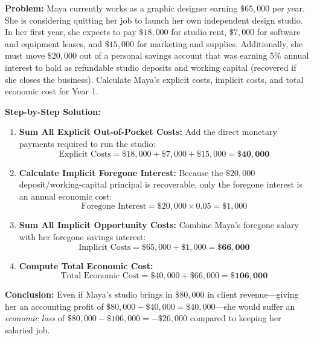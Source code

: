 \documentclass[11pt,letterpaper]{article}
\begin{document}
\begin{tcolorbox}[colback=CourseBlue!5!white,colframe=CourseBlue!80!black,title=\textbf{Work It Out: Calculating Economic vs. Accounting Cost}]
\textbf{Problem:} Maya currently works as a graphic designer earning $\$65{,}000$ per year. She is considering quitting her job to launch her own independent design studio. In her first year, she expects to pay $\$18{,}000$ for studio rent, $\$7{,}000$ for software and equipment leases, and $\$15{,}000$ for marketing and supplies. Additionally, she must move $\$20{,}000$ out of a personal savings account that was earning $5\%$ annual interest to hold as refundable studio deposits and working capital (recovered if she closes the business). Calculate Maya's explicit costs, implicit costs, and total economic cost for Year 1.

\medskip
\noindent\textbf{Step-by-Step Solution:}
\begin{enumerate}
    \item \textbf{Sum All Explicit Out-of-Pocket Costs:}
    Add the direct monetary payments required to run the studio:
    \[
    \text{Explicit Costs} = \$18{,}000 + \$7{,}000 + \$15{,}000 = \mathbf{\$40{,}000}
    \]

    \item \textbf{Calculate Implicit Foregone Interest:}
    Because the $\$20{,}000$ deposit/working-capital principal is recoverable, only the foregone interest is an annual economic cost:
    \[
    \text{Foregone Interest} = \$20{,}000 \times 0.05 = \$1{,}000
    \]

    \item \textbf{Sum All Implicit Opportunity Costs:}
    Combine Maya's foregone salary with her foregone savings interest:
    \[
    \text{Implicit Costs} = \$65{,}000 + \$1{,}000 = \mathbf{\$66{,}000}
    \]

    \item \textbf{Compute Total Economic Cost:}
    \[
    \text{Total Economic Cost} = \$40{,}000 + \$66{,}000 = \mathbf{\$106{,}000}
    \]
\end{enumerate}
\textbf{Conclusion:} Even if Maya's studio brings in $\$80{,}000$ in client revenue—giving her an accounting profit of $\$80{,}000 - \$40{,}000 = \$40{,}000$—she would suffer an \emph{economic loss} of $\$80{,}000 - \$106{,}000 = -\$26{,}000$ compared to keeping her salaried job.
\end{tcolorbox}
\end{document}
